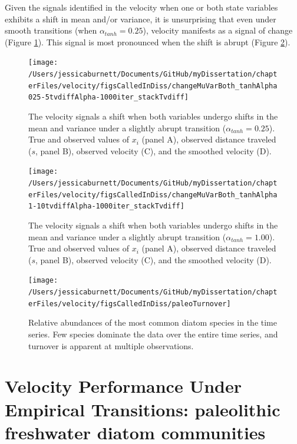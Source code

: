 \documentclass[12pt,twoside,openany]{reedthesis}
\begin{document}
Given the signals identified in the velocity when one or both state variables exhibits a shift in mean and/or variance, it is unsurprising that even under smooth transitions (when \(\alpha_{tanh} = 0.25\)), velocity manifests as a signal of change (Figure \ref{fig:muVarBoth25}). This signal is most pronounced when the shift is abrupt (Figure \ref{fig:muVarBoth1}).
\begin{figure}
\texttt{[image: /Users/jessicaburnett/Documents/GitHub/myDissertation/chapterFiles/velocity/figsCalledInDiss/changeMuVarBoth\_tanhAlpha025-5tvdiffAlpha-1000iter\_stackTvdiff]} \caption{The velocity signals a shift when both variables undergo shifts in the mean and variance under a slightly abrupt transition ($\alpha_{tanh}=0.25$). True and observed values of $x_i$ (panel A), observed distance traveled ($s$, panel B), observed velocity (C), and the smoothed velocity (D).}\label{fig:muVarBoth25}
\end{figure}
\newpage
\begin{figure}
\texttt{[image: /Users/jessicaburnett/Documents/GitHub/myDissertation/chapterFiles/velocity/figsCalledInDiss/changeMuVarBoth\_tanhAlpha1-10tvdiffAlpha-1000iter\_stackTvdiff]} \caption{The velocity signals a shift when both variables undergo shifts in the mean and variance under a slightly abrupt transition ($\alpha_{tanh}=1.00$). True and observed values of $x_i$ (panel A), observed distance traveled ($s$, panel B), observed velocity (C), and the smoothed velocity (D).}\label{fig:muVarBoth1}
\end{figure}
\newpage

\newpage
\begin{figure}
\texttt{[image: /Users/jessicaburnett/Documents/GitHub/myDissertation/chapterFiles/velocity/figsCalledInDiss/paleoTurnover]} \caption{Relative abundances of the most common diatom species in the time series. Few species dominate the data over the entire time series, and turnover is apparent at multiple observations.}\label{fig:paleoTurnover}
\end{figure}
\hypertarget{velocity-performance-under-empirical-transitions-paleolithic-freshwater-diatom-communities}{%
\section{Velocity Performance Under Empirical Transitions: paleolithic freshwater diatom communities}\label{velocity-performance-under-empirical-transitions-paleolithic-freshwater-diatom-communities}}
\end{document}
